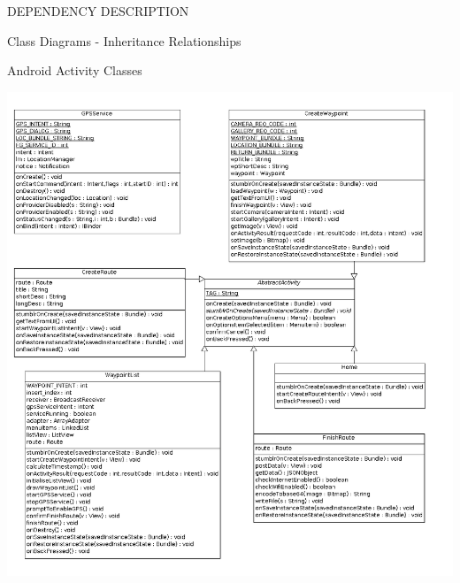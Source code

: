 \documentclass{article}
\begin{document}
\newpage
\begin{section}{DEPENDENCY DESCRIPTION}
	\begin{subsection}{Class Diagrams - Inheritance Relationships}
		\begin{subsubsection}{Android Activity Classes}
		\begin{center}
			\includegraphics[angle=270,width=\columnwidth]{../ClassDiagrams/InterfaceClasses.png}
		\end{center}
		\end{subsubsection}
		

\end{subsection}
\end{section}
\end{document}
